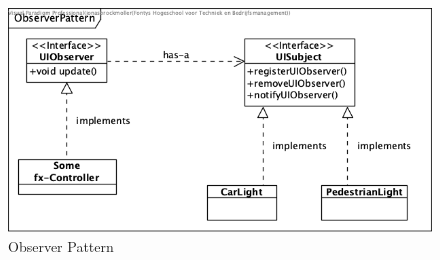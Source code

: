 \documentclass{report}
\begin{document}
    \begin{figure}[H]
        \centering
        \includegraphics{pictures/ObserverPattern.png}
        \caption{Observer Pattern}
        \label{fig:observerPattern}
    \end{figure}
\end{document}
